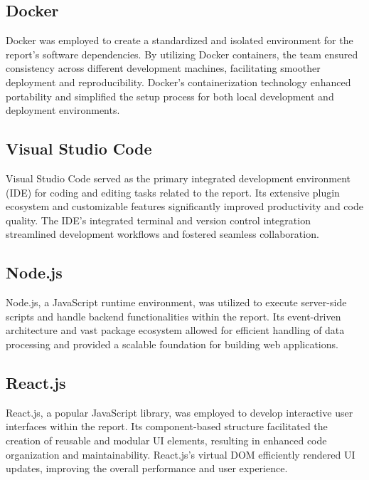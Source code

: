 \vspace{1cm}

\subsection*{Docker}

Docker was employed to create a standardized and isolated environment for the report's software dependencies. By utilizing Docker containers, the team ensured consistency across different development machines, facilitating smoother deployment and reproducibility. Docker's containerization technology enhanced portability and simplified the setup process for both local development and deployment environments.

\vspace{1cm}

\subsection*{Visual Studio Code}

Visual Studio Code served as the primary integrated development environment (IDE) for coding and editing tasks related to the report. Its extensive plugin ecosystem and customizable features significantly improved productivity and code quality. The IDE's integrated terminal and version control integration streamlined development workflows and fostered seamless collaboration.

\vspace{1cm}

\subsection*{Node.js}

Node.js, a JavaScript runtime environment, was utilized to execute server-side scripts and handle backend functionalities within the report. Its event-driven architecture and vast package ecosystem allowed for efficient handling of data processing and provided a scalable foundation for building web applications.

\vspace{1cm}

\subsection*{React.js}

React.js, a popular JavaScript library, was employed to develop interactive user interfaces within the report. Its component-based structure facilitated the creation of reusable and modular UI elements, resulting in enhanced code organization and maintainability. React.js's virtual DOM efficiently rendered UI updates, improving the overall performance and user experience.

